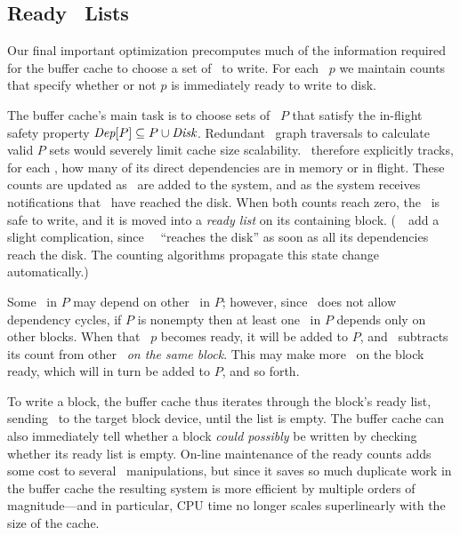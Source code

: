 
\subsection{Ready \Patch\ Lists}
\label{sec:patch:readylist}

\newcommand{\PReady}[1]{\ensuremath{#1.\textit{ready}}}

Our final important optimization precomputes much of the information
required for the buffer cache to choose a set of \patches\ to write.
%
For each \patch\ $p$ we maintain counts that specify whether or not $p$ is
immediately ready to write to disk.


The buffer cache's main task is to choose sets of \patches\ $P$ that satisfy
the in-flight safety property $\PDepset{P} \subseteq P \cup \PDisk$.
%
Redundant \patch\ graph traversals to calculate valid $P$ sets would
severely limit cache size scalability.
%
\Kudos\ therefore explicitly tracks, for each \patch, how many of its
direct dependencies are in memory or in flight.
%
These counts are updated as \patches\ are added to the system, and as the
system receives notifications that \patches\ have reached the disk.
%
When both counts reach zero, the \patch\ is safe to write, and it is moved
into a \emph{ready list} on its containing block.
%
(\Noop\ \patches\ add a slight complication, since \anoop\ \patch\ ``reaches
the disk'' as soon as all its dependencies reach the disk.  The counting
algorithms propagate this state change automatically.)


Some \patches\ in $P$ may depend on other \patches\ in $P$; however, since
\Kudos\ does not allow dependency cycles, if $P$ is nonempty then at least
one \patch\ in $P$ depends only on other blocks.
%
When that \patch\ $p$ becomes ready, it will be added to $P$, and \Kudos\
subtracts its count from other \patches\ \emph{on the same block}.
%
This may make more \patches\ on the block ready, which will in turn be added
to $P$, and so forth.


To write a block, the buffer cache thus iterates through the block's ready
list, sending \patches\ to the target block device, until the list is
empty. 
%
The buffer cache can also immediately tell whether a block \emph{could
possibly} be written by checking whether its ready list is empty.
%
On-line maintenance of the ready counts adds some cost to several \patch\
manipulations, but since it saves so much duplicate work in the buffer
cache the resulting system is more efficient by multiple orders of
magnitude---and in particular, CPU time no longer scales superlinearly with
the size of the cache.


